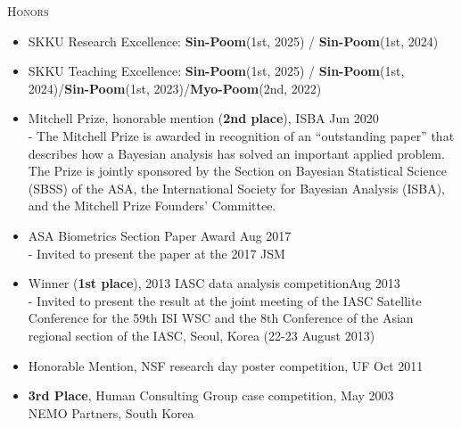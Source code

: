 \documentclass[10pt]{article}
\newenvironment{innerlist}[1][\enskip\textbullet]%
        {\begin{itemize}[#1,leftmargin=*,parsep=0pt,itemsep=0pt,topsep=0pt,partopsep=0pt]}
        {\end{itemize}}
\newcommand{\halfblankline}{\quad\vspace{-0.5\baselineskip}\pagebreak[3]}
\begin{document}
\textsc{Honors}
\begin{innerlist}
\item[] SKKU Research Excellence: {\bf Sin-Poom}(1st, 2025) / {\bf Sin-Poom}(1st, 2024)\\
\item[] SKKU Teaching Excellence: {\bf Sin-Poom}(1st, 2025) / {\bf Sin-Poom}(1st, 2024)/{\bf Sin-Poom}(1st, 2023)/{\bf Myo-Poom}(2nd, 2022)\\
\item[] Mitchell Prize, honorable mention ({\bf 2nd place}), ISBA \hfill Jun 2020\\
- The Mitchell Prize is awarded in recognition of an ``outstanding paper'' that describes how a Bayesian analysis has solved an important applied problem. The Prize is jointly sponsored by the Section on Bayesian Statistical Science (SBSS) of the ASA, the International Society for Bayesian Analysis (ISBA), and the Mitchell Prize Founders’ Committee.\\
\item[] ASA Biometrics Section Paper Award  \hfill Aug 2017\\
- Invited to present the paper at the 2017 JSM\\
\item[] Winner ({\bf 1st place}), 2013 IASC data analysis competition\hfill Aug 2013\\
- Invited to present the result at the joint meeting of the IASC
Satellite Conference for the 59th ISI WSC and the 8th Conference of
the Asian regional section of the IASC, Seoul, Korea (22-23 August
2013)\\ 
\item[] Honorable Mention, NSF research day poster competition, UF \hfill Oct 2011 \\ 
\item[] {\bf 3rd Place}, Human Consulting Group case competition, \hfill May 2003\\ NEMO
  Partners, South Korea
\end{innerlist}

\halfblankline
\end{document}
